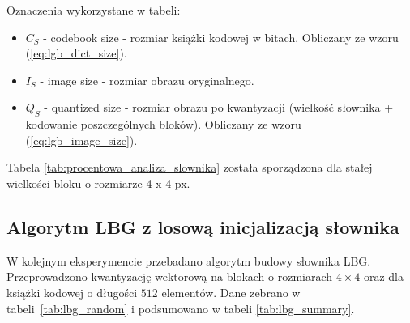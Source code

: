 \documentclass{article}
\begin{document}
Oznaczenia wykorzystane w tabeli:
\begin{itemize}[label=]
  \item $C_S$ - codebook size - rozmiar książki kodowej w bitach. Obliczany ze wzoru (\ref{eq:lgb_dict_size}).
  \item $I_S$ - image size - rozmiar obrazu oryginalnego.
  \item $Q_S$ - quantized size - rozmiar obrazu po kwantyzacji (wielkość słownika + kodowanie poszczególnych bloków). Obliczany ze wzoru (\ref{eq:lgb_image_size}).
\end{itemize}

Tabela \ref{tab:procentowa_analiza_slownika} została sporządzona dla stałej wielkości bloku o rozmiarze 4 x 4 px.

\subsection{Algorytm LBG z losową inicjalizacją słownika}
\label{sec:lbg_psnr}

W kolejnym eksperymencie przebadano algorytm budowy słownika LBG. Przeprowadzono kwantyzację wektorową na blokach o rozmiarach $4 \times 4$ oraz dla książki
kodowej o długości $512$ elementów. Dane zebrano w \mbox{tabeli \ref{tab:lbg_random}} i podsumowano w tabeli \mbox{\ref{tab:lbg_summary}}.
\end{document}
